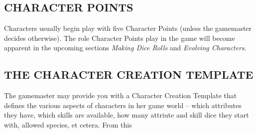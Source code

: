\documentclass[10pt, a4paper, twoside]{book}
\begin{document}
\begin{multicols}{2}
		\subsection*{CHARACTER POINTS}
		Characters usually begin play with five Character Points (unless the gamemaster decides otherwise). The role Character Points play in the game will become apparent in the upcoming sections \textit{Making Dice Rolls} and \textit{Evolving Characters}.
		\begin{mytextbox}
			\subsection*{THE CHARACTER CREATION TEMPLATE}
				The gamemaster may provide you with a Character Creation Template that defines the various aspects of characters in her game world -- which attributes they have, which skills are available, how many attriute and skill dice they start with, allowed species, et cetera. From this 
		\end{mytextbox}	
	\end{multicols}
	\backmatter
\end{document}
